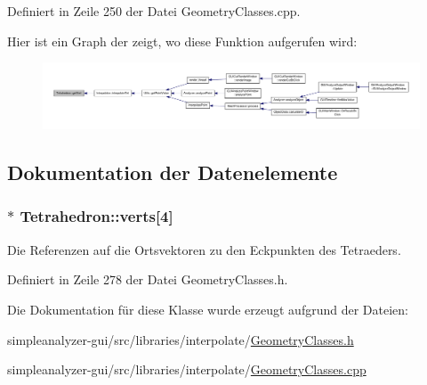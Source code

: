 Definiert in Zeile 250 der Datei Geometry\-Classes.\-cpp.



Hier ist ein Graph der zeigt, wo diese Funktion aufgerufen wird\-:
\nopagebreak
\begin{figure}[H]
\begin{center}
\leavevmode
\includegraphics[width=350pt]{classTetrahedron_a88afe41ae5991168ad51ba4dbb2e1a6b_icgraph}
\end{center}
\end{figure}




\subsection{Dokumentation der Datenelemente}
\hypertarget{classTetrahedron_a4bb7ad83965859998a622b35a97ad935}{
\subsubsection[{verts}]{$\ast$ Tetrahedron\-::verts\mbox{[}4\mbox{]}\hspace{0.3cm}{\ttfamily [private]}}}\label{classTetrahedron_a4bb7ad83965859998a622b35a97ad935}


Die Referenzen auf die Ortsvektoren zu den Eckpunkten des Tetraeders. 



Definiert in Zeile 278 der Datei Geometry\-Classes.\-h.



Die Dokumentation für diese Klasse wurde erzeugt aufgrund der Dateien\-:\begin{DoxyCompactItemize}
\item 
simpleanalyzer-\/gui/src/libraries/interpolate/\hyperlink{GeometryClasses_8h}{Geometry\-Classes.\-h}\item 
simpleanalyzer-\/gui/src/libraries/interpolate/\hyperlink{GeometryClasses_8cpp}{Geometry\-Classes.\-cpp}\end{DoxyCompactItemize}
